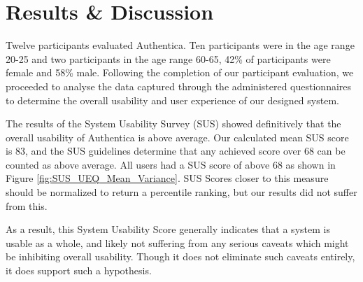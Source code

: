 \documentclass[a4,12pt]{article}
\begin{document}
\section*{Results \& Discussion}

Twelve participants evaluated Authentica.  Ten participants were in the age range 20-25 and two participants in the age range 60-65, 42\% of participants were female and 58\% male.
Following the completion of our participant evaluation, we proceeded to analyse the data captured through the administered questionnaires to determine the overall usability and user experience of our designed system.

The results of the System Usability Survey (SUS) showed definitively that the overall usability of Authentica is above average. Our calculated mean SUS score is 83, and the SUS guidelines determine that any achieved score over 68 can be counted as above average. All users had a SUS score of above 68 as shown in Figure \ref{fig:SUS_UEQ_Mean_Variance}. SUS Scores closer to this measure should be normalized to return a percentile ranking, but our results did not suffer from this.

As a result, this System Usability Score generally indicates that a system is usable as a whole, and likely not suffering from any serious caveats which might be inhibiting overall usability. Though it does not eliminate such caveats entirely, it does support such a hypothesis.
\end{document}

